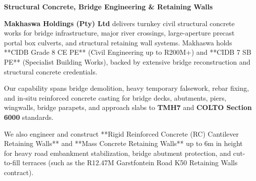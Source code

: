 \documentclass[a4paper,11pt]{article}
\begin{document}
\noindent
\begin{minipage}[t]{0.62\textwidth}
    \vspace{0pt}
    {\large\bfseries\color{mhnavy} Structural Concrete, Bridge Engineering \& Retaining Walls}
    \vspace{0.12cm}

    {\fontsize{9pt}{13pt}\selectfont\color{mhtext}
    \textbf{Makhaswa Holdings (Pty) Ltd} delivers turnkey civil structural concrete works for bridge infrastructure, major river crossings, large-aperture precast portal box culverts, and structural retaining wall systems. Makhaswa holds **CIDB Grade 8 CE PE** (Civil Engineering up to R200M+) and **CIDB 7 SB PE** (Specialist Building Works), backed by extensive bridge reconstruction and structural concrete credentials.
    }

    \vspace{0.22cm}

    {\fontsize{9pt}{13pt}\selectfont\color{mhtext}
    Our capability spans bridge demolition, heavy temporary falsework, rebar fixing, and in-situ reinforced concrete casting for bridge decks, abutments, piers, wingwalls, bridge parapets, and approach slabs to \textbf{TMH7} and \textbf{COLTO Section 6000} standards.
    }

    \vspace{0.22cm}

    {\fontsize{9pt}{13pt}\selectfont\color{mhtext}
    We also engineer and construct **Rigid Reinforced Concrete (RC) Cantilever Retaining Walls** and **Mass Concrete Retaining Walls** up to 6m in height for heavy road embankment stabilization, bridge abutment protection, and cut-to-fill terraces (such as the R12.47M Garstfontein Road K50 Retaining Walls contract).
    }
\end{minipage}
\hfill
\end{document}
